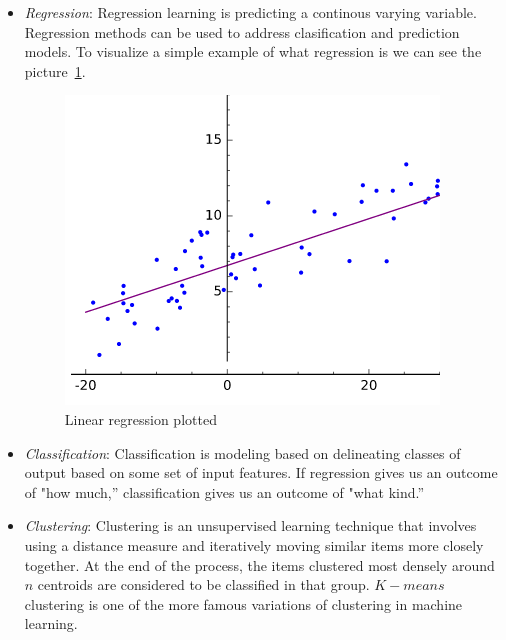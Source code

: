 \begin{itemize}
	\item \textit{Regression}: Regression learning is predicting a continous varying variable. Regression methods can be used to address clasification and prediction models. To visualize a simple example of what regression is we can see the picture~\cref{fig:regresion}.
		\begin{figure}
		\includegraphics[width=\linewidth]{img/regression.png}
		\caption{Linear regression plotted~\cite{tfidf}}
		\label{fig:regresion}
	\end{figure}
	\item \textit{Classification}: Classification is modeling based on delineating classes of output based on some set of input features. If regression gives us an outcome of "how much,” classification gives us an outcome of "what kind.”
	\item \textit{Clustering}: Clustering is an unsupervised learning technique that involves using a distance measure and iteratively moving similar items more closely together. At the end of the process, the items clustered most densely around $n$ centroids are considered to be classified in that group. $K-means$ clustering is one of the more famous variations of clustering in machine learning. 
\end{itemize} 

